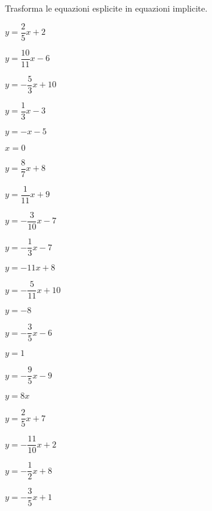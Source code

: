 \begin{esercizio}\label{ese:}
 Trasforma le equazioni esplicite in equazioni implicite.
 \begin{multicols}{3}
 \begin{enumeratea}
  \item  $y = \dfrac{2}{5} x +2$
  \item  $y = \dfrac{10}{11} x -6$
  \item  $y = -\dfrac{5}{3} x +10$
  \item  $y = \dfrac{1}{3} x -3$
  \item  $y = - x -5$
  \item  $x = 0$
  \item  $y = \dfrac{8}{7} x +8$
  \item  $y = \dfrac{1}{11} x +9$
  \item  $y = -\dfrac{3}{10} x -7$
  \item  $y = -\dfrac{1}{3} x -7$
  \item  $y = -11 x +8$
  \item  $y = -\dfrac{5}{11} x +10$
  \item  $y = -8$
  \item  $y = -\dfrac{3}{5} x -6$
  \item  $y = 1$
  \item  $y = -\dfrac{9}{5} x -9$
  \item  $y = 8 x $
  \item  $y = \dfrac{2}{5} x +7$
  \item  $y = -\dfrac{11}{10} x +2$
  \item  $y = -\dfrac{1}{2} x +8$
  \item  $y = -\dfrac{3}{5} x +1$
 \end{enumeratea}
 \end{multicols}
\end{esercizio}

\subsubsection*{}

